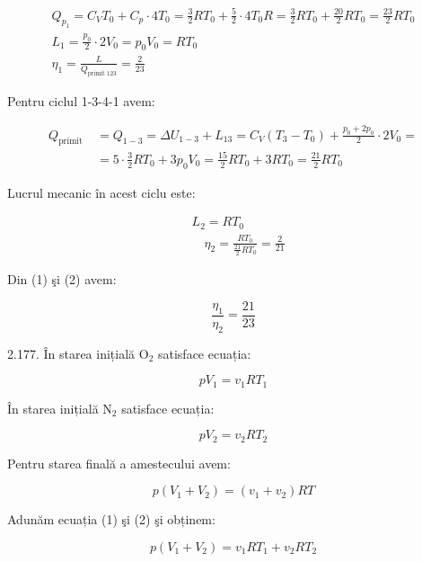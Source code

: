 \begin{gather*}
Q_{p_{1}}=C_{V} T_{0}+C_{p} \cdot 4 T_{0}=\frac{3}{2} R T_{0}+\frac{5}{2} \cdot 4 T_{0} R=\frac{3}{2} R T_{0}+\frac{20}{2} R T_{0}=\frac{23}{2} R T_{0} \\
L_{1}=\frac{p_{0}}{2} \cdot 2 V_{0}=p_{0} V_{0}=R T_{0} \\
\eta_{1}=\frac{L}{Q_{\text {primit } 123}}=\frac{2}{23} \tag{1}
\end{gather*}


Pentru ciclul 1-3-4-1 avem:

$$
\begin{aligned}
Q_{\text {primit }} & =Q_{1-3}=\Delta U_{1-3}+L_{13}=C_{V}\left(T_{3}-T_{0}\right)+\frac{p_{0}+2 p_{0}}{2} \cdot 2 V_{0}= \\
& =5 \cdot \frac{3}{2} R T_{0}+3 p_{0} V_{0}=\frac{15}{2} R T_{0}+3 R T_{0}=\frac{21}{2} R T_{0}
\end{aligned}
$$

Lucrul mecanic în acest ciclu este:


\begin{align*}
& L_{2}=R T_{0} \\
& \quad \eta_{2}=\frac{R T_{0}}{\frac{21}{2} R T_{0}}=\frac{2}{21} \tag{2}
\end{align*}


Din (1) şi (2) avem:

$$
\frac{\eta_{1}}{\eta_{2}}=\frac{21}{23}
$$

2.177. În starea inițială $\mathrm{O}_{2}$ satisface ecuația:


\begin{equation*}
p V_{1}=v_{1} R T_{1} \tag{1}
\end{equation*}


În starea inițială $\mathrm{N}_{2}$ satisface ecuația:


\begin{equation*}
p V_{2}=v_{2} R T_{2} \tag{2}
\end{equation*}


Pentru starea finală a amestecului avem:


\begin{equation*}
p\left(V_{1}+V_{2}\right)=\left(v_{1}+v_{2}\right) R T \tag{3}
\end{equation*}


Adunăm ecuația (1) şi (2) şi obținem:


\begin{equation*}
p\left(V_{1}+V_{2}\right)=v_{1} R T_{1}+v_{2} R T_{2} \tag{4}
\end{equation*}


